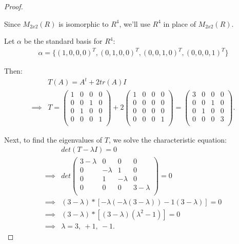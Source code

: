 \documentclass{article}
\begin{document}
\begin{proof}
  $ $

  Since $M_{2x2}(R)$ is isomorphic to $R^4$, we'll use $R^4$ in place of $M_{2x2}(R)$.
  \newline

  Let $\alpha$ be the standard basis for $R^4$:
  \begin{align*}
    \alpha = \{ (1, 0, 0, 0)^T , (0, 1, 0, 0)^T, (0, 0, 1, 0)^T, (0, 0, 0, 1)^T\}
  \end{align*}
  
  Then:
  \begin{align*}
    &T(A) = A^t + 2tr(A)I \\ 
    \implies& T = \begin{pmatrix}
      1 & 0 & 0 & 0 \\
      0 & 0 & 1 & 0 \\
      0 & 1 & 0 & 0 \\
      0 & 0 & 0 & 1 \\
    \end{pmatrix}
    +
    2 \begin{pmatrix}
      1 & 0 & 0 & 0 \\
      0 & 0 & 0 & 0 \\
      0 & 0 & 0 & 0 \\
      0 & 0 & 0 & 1 \\
    \end{pmatrix}
    =
    \begin{pmatrix}
      3 & 0 & 0 & 0 \\
      0 & 0 & 1 & 0 \\
      0 & 1 & 0 & 0 \\
      0 & 0 & 0 & 3 \\
    \end{pmatrix}.
  \end{align*}

  Next, to find the eigenvalues of $T$, we solve the characteristic equation:
  \begin{align*}
    &det(T-\lambda I )
    = 0 \\
    \implies& det \begin{pmatrix}
      3-\lambda & 0 & 0 & 0 \\
      0 & -\lambda & 1 & 0 \\
      0 & 1 & -\lambda & 0 \\
      0 & 0 & 0 & 3-\lambda \\
    \end{pmatrix}
    = 0 \\
    \implies& (3-\lambda) * [
      -\lambda (-\lambda (3-\lambda))
      -1 (3-\lambda)
    ]
    = 0 \\
    \implies& (3-\lambda) * [(3-\lambda) (\lambda^2 - 1)] = 0 \\
    \implies& \lambda = 3, \: +1, \: -1.
  \end{align*}


\end{proof}
\newpage
\end{document}
